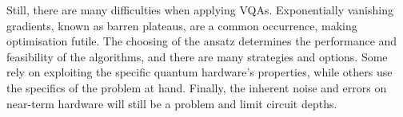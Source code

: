 Still, there are many difficulties when applying VQAs.
Exponentially vanishing gradients, known as barren plateaus, are a common occurrence, making optimisation futile.
The choosing of the ansatz determines the performance and feasibility of the algorithms, and there are many strategies and options.
Some rely on exploiting the specific quantum hardware's properties, while others use the specifics of the problem at hand.
Finally, the inherent noise and errors on near-term hardware will still be a problem and limit circuit depths.